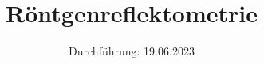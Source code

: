 

\subject{V44}
\title{Röntgenreflektometrie}
\date{
  Durchführung: 19.06.2023
}
\usepackage[aux]{rerunfilecheck}

\usepackage{fontspec}
\usepackage{siunitx}

\usepackage[ngerman]{babel}

\usepackage[unicode]{hyperref}
\usepackage{bookmark}
\usepackage{booktabs}
\usepackage{import}
\usepackage{amsmath}

\usepackage{scrhack}

\usepackage[aux]{rerunfilecheck}

\usepackage{fontspec}

\usepackage[ngerman]{babel}

\usepackage{amsmath}
\usepackage{amssymb}
\usepackage{mathtools}

\usepackage{booktabs}

\usepackage[unicode]{hyperref}
\usepackage{bookmark}
\usepackage{svg}



\maketitle
\thispagestyle{empty}
\tableofcontents
\newpage










\nocite{*}
\printbibliography

\newpage
{}


